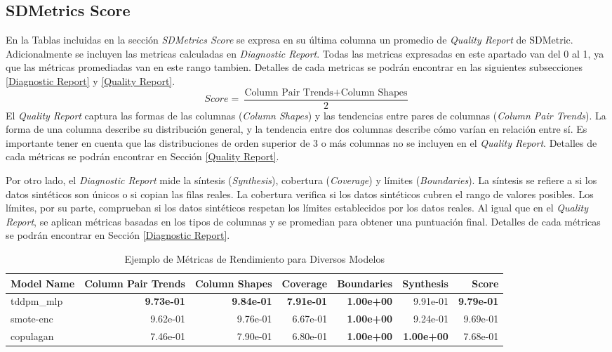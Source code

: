 \subsection{SDMetrics Score}
En la Tablas incluidas en la sección \emph{SDMetrics Score} se expresa en su última columna un promedio de \emph{Quality Report} de SDMetric. Adicionalmente se incluyen las metricas calculadas en \emph{Diagnostic Report}. Todas las metricas expresadas en este apartado van del 0 al 1, ya que las métricas promediadas van en este rango tambien. Detalles de cada metricas se podrán encontrar en las siguientes subsecciones \ref{Diagnostic Report} y \ref{Quality Report}.
\[
    Score = \frac{\text{Column Pair Trends}+\text{Column Shapes}}{2}
\]
El \emph{Quality Report} captura las formas de las columnas (\emph{Column Shapes}) y las tendencias entre pares de columnas (\emph{Column Pair Trends}). La forma de una columna describe su distribución general, y la tendencia entre dos columnas describe cómo varían en relación entre sí. Es importante tener en cuenta que las distribuciones de orden superior de 3 o más columnas no se incluyen en el \emph{Quality Report}. Detalles de cada métricas se podrán encontrar en Sección \ref{Quality Report}.

Por otro lado, el \emph{Diagnostic Report} mide la síntesis (\emph{Synthesis}), cobertura (\emph{Coverage}) y límites (\emph{Boundaries}). La síntesis se refiere a si los datos sintéticos son únicos o si copian las filas reales. La cobertura verifica si los datos sintéticos cubren el rango de valores posibles. Los límites, por su parte, comprueban si los datos sintéticos respetan los límites establecidos por los datos reales. Al igual que en el \emph{Quality Report}, se aplican métricas basadas en los tipos de columnas y se promedian para obtener una puntuación final. Detalles de cada métricas se podrán encontrar en Sección \ref{Diagnostic Report}.

\begin{table}[H]
    \centering
    \fontsize{10}{14}\selectfont
    \caption{Ejemplo de Métricas de Rendimiento para Diversos Modelos}
    \label{example-table-score}
    \begin{tabular}{|l|r|r|r|r|r|r|}
    \hline
    \rowcolor[gray]{0.8}
    Model Name & Column Pair Trends & Column Shapes & Coverage & Boundaries & Synthesis & \textbf{Score} \\
    \hline tddpm\_mlp & \bfseries 9.73e-01 & \bfseries 9.84e-01 & \bfseries 7.91e-01 & \bfseries 1.00e+00 & 9.91e-01 & \bfseries 9.79e-01 \\
    \hline smote-enc & 9.62e-01 & 9.76e-01 & 6.67e-01 & \bfseries 1.00e+00 & 9.24e-01 & 9.69e-01 \\
    \hline copulagan & 7.46e-01 & 7.90e-01 & 6.80e-01 & \bfseries 1.00e+00 & \bfseries 1.00e+00 & 7.68e-01 \\
    \hline
    \end{tabular}
\end{table}




